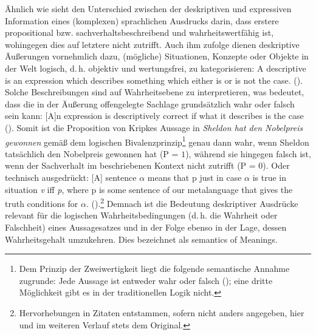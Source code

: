 Ähnlich wie \citet[]{Lang.1983} sieht \citet[]{Kaplan.1997} den Unterschied zwischen der deskriptiven und expressiven Information eines (komplexen) sprachlichen Ausdrucks darin, dass erstere propositional bzw. sachverhaltsbeschreibend und wahrheitswertfähig ist, wohingegen dies auf letztere nicht zutrifft. Auch ihm zufolge dienen deskriptive Äußerungen vornehmlich dazu, (mögliche) Situationen, Konzepte oder Objekte in der Welt logisch, d.\,h. objektiv und wertungsfrei, zu kategorisieren: \glqq{}A descriptive is an expression which describes something which either is or is not the case.\grqq{} (\citealt[4]{Kaplan.1997}). Solche Beschreibungen sind auf Wahrheitsebene zu interpretieren, was bedeutet, dass die in der Äußerung offengelegte Sachlage grundsätzlich wahr oder falsch sein kann: \glqq{}[A]n expression is descriptively correct if what it describes is the case\grqq{} ({\citealt[5]{Kaplan.1997}}). Somit ist die Proposition von Kripkes Aussage in  \textit{Sheldon hat den Nobelpreis gewonnen} gemäß dem logischen Bivalenzprinzip\footnote{Dem Prinzip der Zweiwertigkeit liegt die folgende semantische Annahme zugrunde: \glqq{}Jede Aussage ist entweder wahr oder falsch\grqq{} (\citealt[17]{Schurz.2018}); eine dritte Möglichkeit gibt es in der traditionellen Logik nicht.} genau dann wahr, wenn Sheldon tatsächlich den Nobelpreis gewonnen hat {(P = $1$)}, während sie hingegen falsch ist, wenn der Sachverhalt im beschriebenen Kontext
nicht zutrifft {(P = $0$}). Oder technisch ausgedrückt: \glqq{}[A] sentence \textit{$\alpha$} means that p just in case \textit{$\alpha$} is true in situation \textit{v} iff \textit{p}, where p is some sentence of our metalanguage that gives the truth conditions for \textit{$\alpha$}.\grqq{} ({\citealt[148]{Chierchia.1990}}).\footnote{Hervorhebungen in Zitaten entstammen, sofern nicht anders angegeben, hier und im weiteren Verlauf stets dem Original.} Demnach ist die Bedeutung deskriptiver Ausdrücke relevant für die logischen Wahrheitsbedingungen (d.\,h. die Wahrheit oder Falschheit) eines Aussagesatzes und in der Folge ebenso in der Lage, dessen Wahrheitsgehalt umzukehren. Dies bezeichnet \citet[11:40]{Kaplan.2004} als \glqq{}semantics of Meanings\grqq{}.

